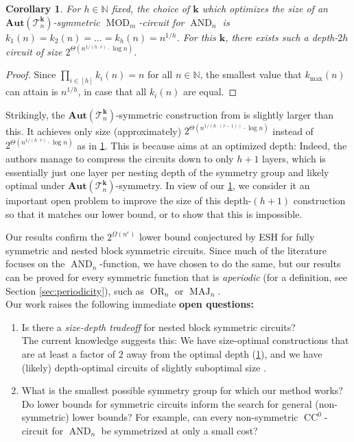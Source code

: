\documentclass[11pt]{article}
\DeclareMathOperator{\MOD}{MOD}
\DeclareMathOperator{\AND}{AND}
\newcommand{\Aut}{\mathbf{Aut}}
\newcommand{\bbN}{\mathbb{N}}
\newcommand{\Tt}{{\mathcal T}}
\theoremstyle{definition}
\theoremstyle{plain}
\newtheorem{corollary}[definition]{Corollary}
\theoremstyle{remark}
\theoremstyle{remark}
\renewcommand{\epsilon}{\varepsilon}
\DeclareMathOperator{\CC}{CC}
\DeclareMathOperator{\MAJ}{MAJ}
\DeclareMathOperator{\OR}{OR}
\begin{document}
\begin{corollary}
	\label{cor:optimalNestedSize}
	For $h \in \bbN$ fixed, the choice of $\boldsymbol{k}$ which optimizes the size of an $\Aut(\Tt_n^{\boldsymbol k})$-symmetric $\MOD_m$-circuit for $\AND_n$ is $k_1(n) = k_2(n) = \dots = k_h(n) = n^{1/h}$. For this $\boldsymbol{k}$, there exists such a depth-$2h$ circuit of size $2^{\Theta(n^{1/(h \cdot r)} \cdot \log n)}$.
\end{corollary}	
\begin{proof}
	Since $\prod_{i \in [h]} k_i(n) = n$ for all $n \in \bbN$, the smallest value that $k_{\text{max}}(n)$ can attain is $n^{1/h}$, in case that all $k_i(n)$ are equal.
\end{proof}	
Strikingly, the $\Aut(\Tt_n^{\boldsymbol{k}})$-symmetric construction from \cite[Proposition 4.3]{IdziakKK22LICS} is slightly larger than this. It achieves only size (approximately) $2^{\Theta(n^{1/(h \cdot (r-1))} \cdot \log n)}$ instead of $2^{\Theta(n^{1/(h \cdot r)} \cdot \log n)}$ as in \cref{cor:optimalNestedSize}. 
This is because \cite[Proposition 4.3]{IdziakKK22LICS} aims at an optimized depth: Indeed, the authors manage to compress the circuits down to only $h+1$ layers, which is essentially just one layer per nesting depth of the symmetry group and likely optimal under $\Aut(\Tt_n^{\boldsymbol{k}})$-symmetry. In view of our \cref{cor:optimalNestedSize}, we consider it an important open problem to improve the size of this depth-$(h+1)$ construction so that it matches our lower bound, or to show that this is impossible. 

Our results confirm the $2^{\Omega(n^\epsilon)}$ lower bound conjectured by ESH for fully symmetric and nested block symmetric circuits. Since much of the literature focuses on the $\AND_n$-function, we have chosen to do the same, but our results can be proved for every symmetric function that is \emph{aperiodic} (for a definition, see Section \ref{sec:periodicity}), such as $\OR_n$ or $\MAJ_n$.\\ 

Our work raises the following immediate \textbf{open questions:}\\
\vspace*{-1em}
\begin{enumerate}
	\item Is there a \emph{size-depth tradeoff} for nested block symmetric circuits?\\ The current knowledge suggests this: We have size-optimal constructions that are at least a factor of $2$ away from the optimal depth (\cref{cor:optimalNestedSize}), and we have (likely) depth-optimal circuits of slightly suboptimal size \cite[Proposition 4.3]{IdziakKK22LICS}.
	\item What is the smallest possible symmetry group for which our method works? Do lower bounds for symmetric circuits inform the search for general (non-symmetric) lower bounds? For example, can every non-symmetric $\CC^0$-circuit for $\AND_n$ be symmetrized at only a small cost?
\end{enumerate}	
\end{document}
